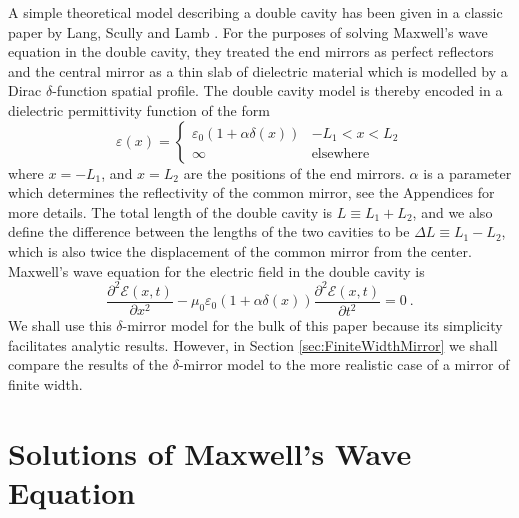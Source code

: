 \documentclass[twocolumn,english,pra,aps,superscriptaddress,floatfix]{revtex4-1}
\begin{document}
A simple theoretical model describing a double cavity has been given in a classic paper by 
Lang, Scully and Lamb \cite{lang73}. For the purposes of solving Maxwell's wave equation in the double cavity, they treated the end mirrors as perfect reflectors and the central mirror as a thin slab of dielectric material which is modelled by a Dirac $\delta$-function spatial profile. The double cavity model is thereby encoded in a dielectric permittivity function of the form
 \begin{equation}
\varepsilon(x)=\begin{cases}
\varepsilon_{0}(1+\alpha \delta(x)) & -L_{1}<x<L_{2}\\
\infty & \mbox{elsewhere}\end{cases}
\label{perm}
\end{equation}
where $x=-L_{1}$, and $x=L_{2}$ are the positions of the end mirrors. $\alpha$ is a parameter which determines the reflectivity of the common mirror, see the Appendices for more details. The total length of the double cavity is $L \equiv L_{1}+L_{2}$, and we also define the difference between the lengths of the two cavities to be $\Delta L \equiv L_{1}-L_{2}$,  which is also twice the displacement of the common mirror from the center. Maxwell's wave equation for the electric field in the double cavity is
\begin{equation}
\frac{\partial^{2}\mathcal{E}(x,t)}{\partial x^{2}}-\mu_{0}\varepsilon_{0}(1+\alpha\delta(x))\frac{\partial^{2}\mathcal{E}(x,t)}{\partial t^{2}}=0 \ .
\label{maxwell}
\end{equation}
We shall use this $\delta$-mirror model for the bulk of this paper because its simplicity facilitates analytic results. However, in Section \ref{sec:FiniteWidthMirror} we shall compare the results of the $\delta$-mirror model to the more realistic case of a mirror of finite width. 


\section{Solutions of Maxwell's Wave Equation}
\label{sec:MaxwellEqns}
\end{document}
